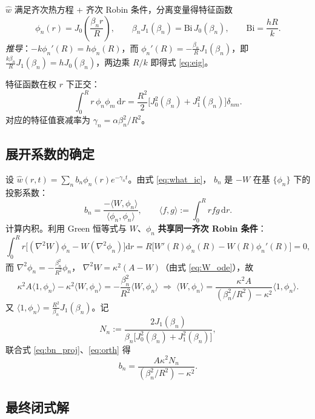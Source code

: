 \documentclass[11pt,a4paper]{article}
\theoremstyle{definition}
\begin{document}
$\hat w$ 满足齐次热方程 + 齐次 Robin 条件，分离变量得特征函数
\begin{equation}
\phi_n(r)=J_0\!\left(\frac{\beta_n r}{R}\right),
\qquad
\beta_n J_1(\beta_n)=\mathrm{Bi}\,J_0(\beta_n),
\qquad
\mathrm{Bi}=\frac{hR}{k}.
\label{eq:eig}
\end{equation}
\emph{推导}：$-k\phi_n'(R)=h\phi_n(R)$，而
$\phi_n'(R)=-\frac{\beta_n}{R}J_1(\beta_n)$，即
$\frac{k\beta_n}{R}J_1(\beta_n)=hJ_0(\beta_n)$，两边乘 $R/k$ 即得式 \eqref{eq:eig}。

特征函数在权 $r$ 下正交：
\begin{equation}
\int_0^R r\,\phi_n\phi_m\,\mathrm{d}r
=\frac{R^2}{2}\Big[J_0^2(\beta_n)+J_1^2(\beta_n)\Big]\delta_{nm}.
\label{eq:orth}
\end{equation}
对应的特征值衰减率为 $\gamma_n=\alpha\beta_n^2/R^2$。

\subsection{展开系数的确定}

设 $\hat w(r,t)=\sum_n b_n\phi_n(r)e^{-\gamma_nt}$。由式 \eqref{eq:what_ic}，
$b_n$ 是 $-W$ 在基 $\{\phi_n\}$ 下的投影系数：
\begin{equation}
b_n=\frac{-\langle W,\phi_n\rangle}{\langle\phi_n,\phi_n\rangle},
\qquad \langle f,g\rangle:=\int_0^R r f g\,\mathrm{d}r .
\label{eq:bn_proj}
\end{equation}
计算内积。利用 Green 恒等式与 $W$、$\phi_n$ \textbf{共享同一齐次 Robin 条件}：
\[
\int_0^R r\big[(\nabla^2W)\phi_n-W(\nabla^2\phi_n)\big]\mathrm{d}r
=R\big[W'(R)\phi_n(R)-W(R)\phi_n'(R)\big]=0,
\]
而 $\nabla^2\phi_n=-\frac{\beta_n^2}{R^2}\phi_n$，
$\nabla^2W=\kappa^2(A-W)$（由式 \eqref{eq:W_ode}），故
\[
\kappa^2A\langle 1,\phi_n\rangle-\kappa^2\langle W,\phi_n\rangle
=-\frac{\beta_n^2}{R^2}\langle W,\phi_n\rangle
\;\Longrightarrow\;
\langle W,\phi_n\rangle=\frac{\kappa^2A}{(\beta_n^2/R^2)-\kappa^2}\langle 1,\phi_n\rangle .
\]
又 $\langle 1,\phi_n\rangle=\frac{R^2}{\beta_n}J_1(\beta_n)$。记
\begin{equation}
N_n:=\frac{2J_1(\beta_n)}{\beta_n\big[J_0^2(\beta_n)+J_1^2(\beta_n)\big]},
\label{eq:Nn}
\end{equation}
联合式 \eqref{eq:bn_proj}、\eqref{eq:orth} 得
\begin{equation}
\boxed{\;b_n=\frac{A\kappa^2N_n}{(\beta_n^2/R^2)-\kappa^2}.\;}
\label{eq:bn}
\end{equation}

\subsection{最终闭式解}
\end{document}
